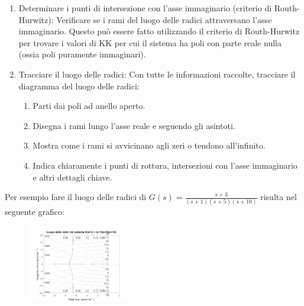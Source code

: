 \begin{enumerate}[label=\roman*.]
    \item Determinare i punti di intersezione con l'asse immaginario (criterio di Routh-Hurwitz): Verificare se i rami del luogo delle radici attraversano l'asse immaginario. Questo può essere fatto utilizzando il criterio di Routh-Hurwitz per trovare i valori di KK per cui il sistema ha poli con parte reale nulla (ossia poli puramente immaginari).

    \item Tracciare il luogo delle radici: Con tutte le informazioni raccolte, tracciare il diagramma del luogo delle radici:
    \begin{enumerate}
        \item Parti dai poli ad anello aperto.
        \item Disegna i rami lungo l'asse reale e seguendo gli asintoti.
        \item Mostra come i rami si avvicinano agli zeri o tendono all'infinito.
        \item Indica chiaramente i punti di rottura, intersezioni con l'asse immaginario e altri dettagli chiave.
    \end{enumerate}
\end{enumerate}

Per esempio fare il luogo delle radici di $G(s) = \frac{s + 3}{(s + 1)(s + 5)(s + 10)}$ risulta nel seguente grafico:
\begin{figure}[h]
    \centering
    \includegraphics[width=0.4\textwidth]{Immagini/luogo_delle_radici.png}
\end{figure}

